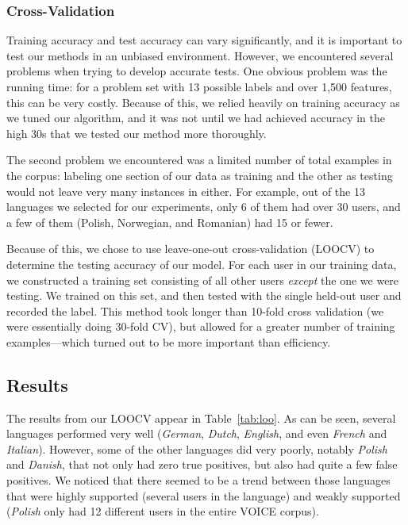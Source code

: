 \documentclass[11pt]{article}
\begin{document}
\subsubsection{Cross-Validation}
Training accuracy and test accuracy can vary significantly, and it is important to test our methods in an unbiased environment.  However, we encountered several problems when trying to develop accurate tests.  One obvious problem was the running time:  for a problem set with 13 possible labels and over 1,500 features, this can be very costly.  Because of this, we relied heavily on training accuracy as we tuned our algorithm, and it was not until we had achieved accuracy in the high 30s that we tested our method more thoroughly.

The second problem we encountered was a limited number of total examples in the corpus:  labeling one section of our data as training and the other as testing would not leave very many instances in either.  For example, out of the 13 languages we selected for our experiments, only 6 of them had over 30 users, and a few of them (Polish, Norwegian, and Romanian) had 15 or fewer.  

Because of this, we chose to use leave-one-out cross-validation (LOOCV) to determine the testing accuracy of our model.  For each user in our training data, we constructed a training set consisting of all other users {\it except} the one we were testing.  We trained on this set, and then tested with the single held-out user and recorded the label.  This method took longer than 10-fold cross validation (we were essentially doing 30-fold CV), but allowed for a greater number of training examples---which turned out to be more important than efficiency.

\subsection{Results}

The results from our LOOCV appear in Table~\ref{tab:loo}.  As can be seen, several languages performed very well ({\it German}, {\it Dutch}, {\it English}, and even {\it French} and {\it Italian}).  However, some of the other languages did very poorly, notably {\it Polish} and {\it Danish}, that not only had zero true positives, but also had quite a few false positives.  We noticed that there seemed to be a trend between those languages that were highly supported (several users in the language) and weakly supported ({\it Polish} only had 12 different users in the entire VOICE corpus).  
\end{document}
